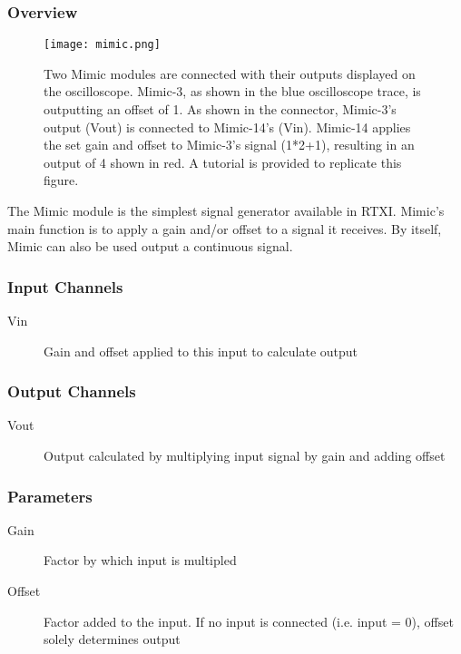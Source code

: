 
\subsubsection{Overview}
\label{Mimic}

\begin{figure}[h]
\begin{center}
\texttt{[image: mimic.png]} 
\caption[Mimic]{Two Mimic modules are connected with their outputs displayed on the oscilloscope. Mimic-3, as shown in the blue oscilloscope trace, is outputting an offset of 1. As shown in the connector, Mimic-3's output (Vout) is connected to Mimic-14's (Vin). Mimic-14 applies the set gain and offset to Mimic-3's signal (1*2+1), resulting in an output of 4 shown in red. A tutorial is provided to replicate this figure.}
\end{center}
\label{mimic1}
\end{figure}

The Mimic module is the simplest signal generator available in RTXI. Mimic's main function is to apply a gain and/or offset to a signal it receives. By itself, Mimic can also be used output a continuous signal.

\subsubsection{Input Channels}
\begin{description}
\item [Vin]Gain and offset applied to this input to calculate output
\end{description}

\subsubsection{Output Channels}
\begin{description}
\item [Vout]Output calculated by multiplying input signal by gain and adding offset
\end{description}

\subsubsection{Parameters}
\begin{description}
\item [Gain]Factor by which input is multipled
\item [Offset]Factor added to the input. If no input is connected (i.e. input = 0), offset solely determines output
\end{description}

